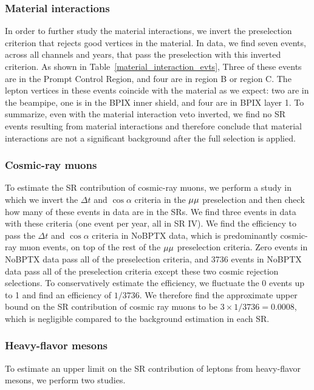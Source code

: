 \subsubsection{Material interactions}
In order to further study the material interactions, we invert the preselection criterion that rejects good vertices in the material. In data, we find seven events, across all channels and years, that pass the preselection with this inverted criterion. As shown in Table~\ref{material_interaction_evts}, Three of these events are in the Prompt Control Region, and four are in region B or region C. The lepton vertices in these events coincide with the material as we expect: two are in the beampipe, one is in the BPIX inner shield, and four are in BPIX layer 1. To summarize, even with  the material interaction veto inverted, we find no SR events resulting from material interactions and therefore conclude that material interactions are not a significant background after the full selection is applied.



\subsubsection{Cosmic-ray muons}
To estimate the SR contribution of cosmic-ray muons, we perform a study in which we invert the $\Delta t$ and $\cos{\alpha}$ criteria in the ${\mu}{\mu}$ preselection and then check how many of these events in data are in the SRs. We find three events in data with these criteria (one event per year, all in SR IV). We find the efficiency to pass the $\Delta t$ and $\cos{\alpha}$ criteria in NoBPTX data, which is predominantly cosmic-ray muon events, on top of the rest of the ${\mu}{\mu}$ preselection criteria. Zero events in NoBPTX data pass all of the preselection criteria, and 3736 events in NoBPTX data pass all of the preselection criteria except these two cosmic rejection selections. To conservatively estimate the efficiency, we fluctuate the 0 events up to 1 and find an efficiency of $1/3736$. We therefore find the approximate upper bound on the SR contribution of cosmic ray muons to be $3 \times 1/3736 = 0.0008$, which is negligible compared to the background estimation in each SR.

\subsubsection{Heavy-flavor mesons}
To estimate an upper limit on the SR contribution of leptons from heavy-flavor mesons, we perform two studies.

